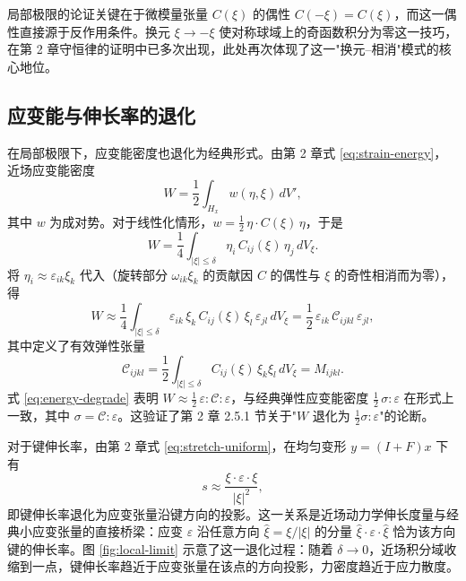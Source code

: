 \begin{remark}
局部极限的论证关键在于微模量张量 $C(\xi)$ 的偶性 $C(-\xi)=C(\xi)$，而这一偶性直接源于反作用条件。换元 $\xi\to-\xi$ 使对称球域上的奇函数积分为零这一技巧，在第 2 章守恒律的证明中已多次出现，此处再次体现了这一"换元--相消"模式的核心地位。
\end{remark}

\subsection{应变能与伸长率的退化}
\label{subsec:energy-stretch-degrade}

在局部极限下，应变能密度也退化为经典形式。由第 2 章式 \eqref{eq:strain-energy}，近场应变能密度
\begin{equation}
\label{eq:pd-energy-recall}
W = \frac{1}{2}\int_{H_x} w(\eta,\xi)\,dV',
\end{equation}
其中 $w$ 为成对势。对于线性化情形，$w=\tfrac{1}{2}\,\eta\cdot C(\xi)\,\eta$，于是
\begin{equation}
\label{eq:linear-energy}
W = \frac{1}{4}\int_{|\xi|\le\delta} \eta_i\,C_{ij}(\xi)\,\eta_j\,dV_\xi.
\end{equation}
将 $\eta_i\approx\varepsilon_{ik}\xi_k$ 代入（旋转部分 $\omega_{ik}\xi_k$ 的贡献因 $C$ 的偶性与 $\xi$ 的奇性相消而为零），得
\begin{equation}
\label{eq:energy-degrade}
W \approx \frac{1}{4}\int_{|\xi|\le\delta} \varepsilon_{ik}\,\xi_k\,C_{ij}(\xi)\,\xi_l\,\varepsilon_{jl}\,dV_\xi = \frac{1}{2}\,\varepsilon_{ik}\,\mathcal{C}_{ijkl}\,\varepsilon_{jl},
\end{equation}
其中定义了有效弹性张量
\begin{equation}
\label{eq:effective-elastic-tensor}
\mathcal{C}_{ijkl} = \frac{1}{2}\int_{|\xi|\le\delta} C_{ij}(\xi)\,\xi_k\xi_l\,dV_\xi = M_{ijkl}.
\end{equation}
式 \eqref{eq:energy-degrade} 表明 $W\approx\tfrac{1}{2}\,\varepsilon:\mathcal{C}:\varepsilon$，与经典弹性应变能密度 $\tfrac{1}{2}\,\sigma:\varepsilon$ 在形式上一致，其中 $\sigma=\mathcal{C}:\varepsilon$。这验证了第 2 章 2.5.1 节关于"$W$ 退化为 $\tfrac{1}{2}\sigma:\varepsilon$"的论断。

对于键伸长率，由第 2 章式 \eqref{eq:stretch-uniform}，在均匀变形 $y=(I+F)x$ 下有
\begin{equation}
\label{eq:stretch-degrade}
s \approx \frac{\xi\cdot\varepsilon\cdot\xi}{|\xi|^2},
\end{equation}
即键伸长率退化为应变张量沿键方向的投影。这一关系是近场动力学伸长度量与经典小应变张量的直接桥梁：应变 $\varepsilon$ 沿任意方向 $\hat{\xi}=\xi/|\xi|$ 的分量 $\hat{\xi}\cdot\varepsilon\cdot\hat{\xi}$ 恰为该方向键的伸长率。图 \ref{fig:local-limit} 示意了这一退化过程：随着 $\delta\to 0$，近场积分域收缩到一点，键伸长率趋近于应变张量在该点的方向投影，力密度趋近于应力散度。

